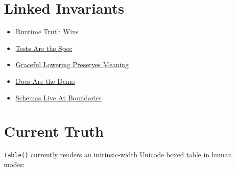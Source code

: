 \section{Linked Invariants}\label{record-133-linked-invariants}

\begin{itemize}
\tightlist
\item
  \href{https://github.com/flyingrobots/bijou/blob/cbd70612140e7a450d764b3c7be1c6af878b99bc/docs/invariants/runtime-truth-wins.md}{Runtime Truth Wins}
\item
  \href{https://github.com/flyingrobots/bijou/blob/cbd70612140e7a450d764b3c7be1c6af878b99bc/docs/invariants/tests-are-the-spec.md}{Tests Are the Spec}
\item
  \href{https://github.com/flyingrobots/bijou/blob/cbd70612140e7a450d764b3c7be1c6af878b99bc/docs/invariants/graceful-lowering-preserves-meaning.md}{Graceful Lowering Preserves Meaning}
\item
  \href{https://github.com/flyingrobots/bijou/blob/cbd70612140e7a450d764b3c7be1c6af878b99bc/docs/invariants/docs-are-the-demo.md}{Docs Are the Demo}
\item
  \href{https://github.com/flyingrobots/bijou/blob/cbd70612140e7a450d764b3c7be1c6af878b99bc/docs/invariants/schemas-live-at-boundaries.md}{Schemas Live At Boundaries}
\end{itemize}

\section{Current Truth}\label{record-133-current-truth}

\texttt{t\allowbreak{}a\allowbreak{}b\allowbreak{}l\allowbreak{}e\allowbreak{}(\allowbreak{})} currently renders an intrinsic-width Unicode boxed table in human modes:

